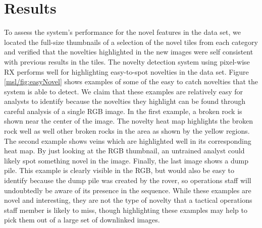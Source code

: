\section{Results}
To assess the system's performance for the novel features in the \cite{kerner_data} data set, we located the full-size thumbnails of a selection of the novel tiles from each category and verified that the novelties highlighted in the new images were self consistent with previous results in the tiles. 
The novelty detection system using pixel-wise RX performs well for highlighting easy-to-spot novelties in the data set. 
Figure \ref{msl/fig:easyNovel} shows examples of some of the easy to catch novelties that the system is able to detect. 
We claim that these examples are relatively easy for analysts to identify because the novelties they highlight can be found through careful analysis of a single RGB image.
In the first example, a broken rock is shown near the center of the image.
The novelty heat map highlights the broken rock well as well other broken rocks in the area as shown by the yellow regions.
The second example shows veins which are highlighted well in its corresponding heat map. 
By just looking at the RGB thumbnail, an untrained analyst could likely spot something novel in the image. 
Finally, the last image shows a dump pile.
This example is clearly visible in the RGB, but would also be easy to identify because the dump pile was created by the rover, so operations staff will undoubtedly be aware of its presence in the sequence. 
While these examples are novel and interesting, they are not the type of novelty that a tactical operations staff member is likely to miss, though highlighting these examples may help to pick them out of a large set of downlinked images. 

